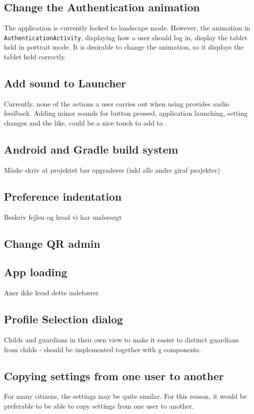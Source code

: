 \subsection{Change the Authentication animation}
The application is currently locked to landscape mode.
However, the animation in \lstinline!AuthenticationActivity!, displaying how a user should log in, display the tablet held in portrait mode.
It is desirable to change the animation, so it displays the tablet held correctly.

\subsection{Add sound to Launcher}
Currently, none of the actions a user carries out when using \launcher provides audio feedback.
Adding minor sounds for button pressed, application launching, setting changes and the like, could be a nice touch to add to \launcher. 

\subsection{Android and Gradle build system}
Måske skriv at projektet bør opgraderes (inkl alle andre giraf projekter)

\subsection{Preference indentation}
Beskriv fejlen og hvad vi har undersøgt

\subsection{Change QR admin}

\subsection{App loading}
Aner ikke hvad dette indebærer

\subsection{Profile Selection dialog}
Childs and guardians in their own view to make it easier to distinct guardians from childs - should be implemented together with g components.

\subsection{Copying settings from one user to another}
For many citizens, the settings may be quite similar.
For this reason, it would be preferable to be able to copy settings from one user to another.
